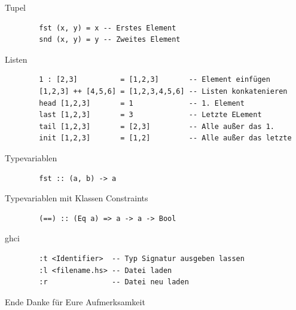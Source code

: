 \documentclass[
	aspectratio=169, 
	10pt 
]{beamer}
\begin{document}
\begin{frame}[fragile,t]{Tupel}
	\begin{verbatim}
		fst (x, y) = x -- Erstes Element
		snd (x, y) = y -- Zweites Element  
	\end{verbatim}
\end{frame}

\begin{frame}[fragile]{Listen} 
	\begin{verbatim}
		1 : [2,3]          = [1,2,3]       -- Element einfügen
		[1,2,3] ++ [4,5,6] = [1,2,3,4,5,6] -- Listen konkatenieren
		head [1,2,3]       = 1             -- 1. Element
		last [1,2,3]       = 3             -- Letzte ELement
		tail [1,2,3]       = [2,3]         -- Alle außer das 1.
		init [1,2,3]       = [1,2]         -- Alle außer das letzte
	\end{verbatim}
\end{frame}

\begin{frame}[fragile]{Typevariablen}
	\begin{verbatim}
		fst :: (a, b) -> a
	\end{verbatim}
\end{frame}

\begin{frame}[fragile]{Typevariablen mit Klassen Constraints}
	\begin{verbatim}
		(==) :: (Eq a) => a -> a -> Bool
	\end{verbatim}
\end{frame}

\begin{frame}[fragile]{ghci} 
	\begin{verbatim}
		:t <Identifier>  -- Typ Signatur ausgeben lassen
		:l <filename.hs> -- Datei laden
		:r               -- Datei neu laden
	\end{verbatim}
\end{frame}

\begin{frame}{Ende}
	\center Danke für Eure Aufmerksamkeit
\end{frame}
\end{document}
